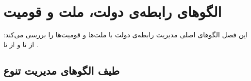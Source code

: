 
\chapter{الگوهای رابطه‌ی دولت، ملت و قومیت}

\begin{keybox}
این فصل الگوهای اصلی مدیریت رابطه‌ی دولت با ملت‌ها و قومیت‌ها را بررسی می‌کند:
از  تا  و از  تا .
\end{keybox}

\section{طیف الگوهای مدیریت تنوع}

